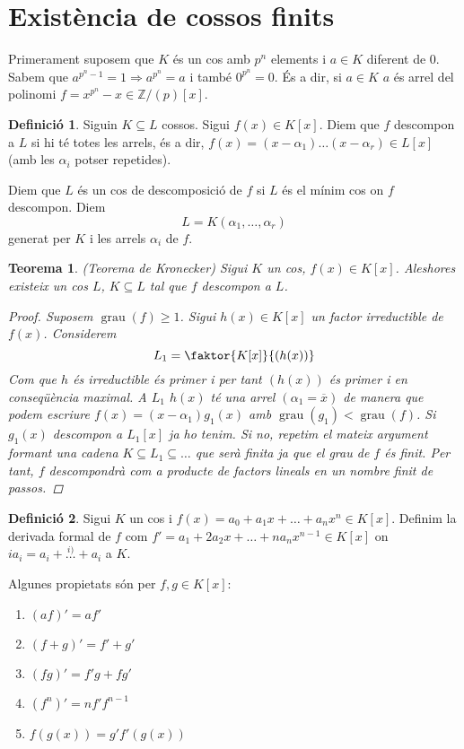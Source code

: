 \documentclass[a4paper,11pt]{report}
\DeclareMathOperator{\grau}{grau}
\renewcommand{\bar}{\overline}
\newcommand{\im}{\Rightarrow}
\theoremstyle{theorem}
\newtheorem{teorema}{\normalfont \sffamily\bfseries Teorema}[section]
\theoremstyle{definition}
\newtheorem{definicio}{\normalfont\sffamily\bfseries Definició}[section]
\begin{document}
\section{Existència de cossos finits}
 Primerament suposem que $K$ és un cos amb $p^n$ elements i $a\in K$ diferent de 0. Sabem que $a^{p^n-1}=1\im a^{p^n}=a$ i també $0^{p^n}=0$. És a dir, si $a\in K$ $a$ és arrel del polinomi $f=x^{p^n}-x\in \mathbb{Z}/(p)[x]$.
 \begin{definicio}
 	Siguin $K\subseteq L$ cossos. Sigui $f(x)\in K[x]$. Diem que $f$ descompon a $L$ si hi té totes les arrels, és a dir, $f(x)=(x-\alpha_1)\ldots(x-\alpha_r)\in L[x]$ (amb les $\alpha_i$ potser repetides).
 	
 	Diem que $L$ és un cos de descomposició de $f$ si $L$ és el mínim cos on $f$ descompon. Diem
 	$$L=K(\alpha_1,\ldots,\alpha_r)$$
 	generat per $K$ i les arrels $\alpha_i$ de $f$.
 \end{definicio} 
\begin{teorema}(Teorema de Kronecker)
Sigui $K$ un cos, $f(x)\in K[x]$. Aleshores existeix un cos $L$, $K\subseteq L$ tal que $f$ descompon a $L$.
\begin{proof}
	Suposem $\grau(f)\geq 1$. Sigui $h(x)\in K[x]$ un factor irreductible de $f(x)$. Considerem $$L_1=\faktor{K[x]}{(h(x))}$$ Com que $h$ és irreductible és primer i per tant $(h(x))$ és primer i en conseqüència maximal. A $L_1$ $h(x)$ té una arrel $(\alpha_1=\bar{x})$ de manera que podem escriure $f(x)=(x-\alpha_1)g_1(x)$ amb $\grau(g_1)<\grau(f)$. Si $g_1(x)$ descompon a $L_1[x]$ ja ho tenim. Si no, repetim el mateix argument formant una cadena $K\subseteq L_1\subseteq\ldots$ que serà finita ja que el grau de $f$ és finit. Per tant, $f$ descompondrà com a producte de factors lineals en un nombre finit de passos.
\end{proof}
\end{teorema}
\begin{definicio}
	Sigui $K$ un cos i $f(x)=a_0+a_1x+\ldots+a_nx^n\in K[x]$. Definim la derivada formal de $f$ com $f'=a_1+2a_2x+\ldots+na_{n}x^{n-1}\in K[x]$ on $ia_i=a_i+\stackrel{i)}\ldots+a_i$ a $K$.
\end{definicio}
Algunes propietats són per $f,g\in K[x]$:
\begin{enumerate}
	\item $(af)'=af'$\item $(f+g)'=f'+g'$\item $(fg)'=f'g+fg'$\item $(f^n)'=nf'f^{n-1}$\item $f(g(x))=g'f'(g(x))$
\end{enumerate}
\end{document}
